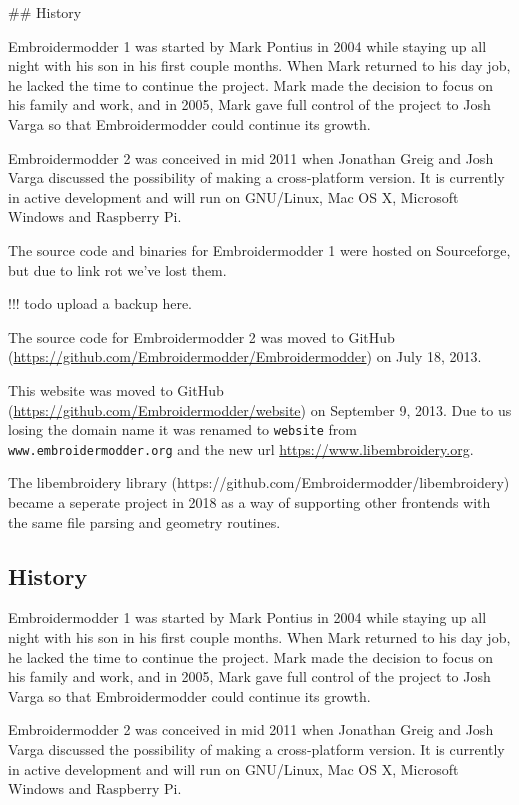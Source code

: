 ## History

Embroidermodder 1 was started by Mark Pontius in 2004 while staying up all night
with his son in his first couple months. When Mark returned to his day job,
he lacked the time to continue the project. Mark made the decision to focus on his
family and work, and in 2005, Mark gave full control of the project to Josh Varga
so that Embroidermodder could continue its growth.

Embroidermodder 2 was conceived in mid 2011 when Jonathan Greig and Josh Varga
discussed the possibility of making a cross-platform version. It is currently in
active development and will run on GNU/Linux, Mac OS X, Microsoft Windows and Raspberry Pi.

The source code and binaries for Embroidermodder 1 were hosted on Sourceforge, but
due to link rot we've lost them.

!!! todo
    upload a backup here.

The source code for Embroidermodder
2 was moved to GitHub (\url{https://github.com/Embroidermodder/Embroidermodder})
on July 18, 2013.

This website was moved to
GitHub (\url{https://github.com/Embroidermodder/website}) on September 9, 2013. Due to us losing the domain name it was renamed to
\texttt{website} from \texttt{www.embroidermodder.org} and the new url \url{https://www.libembroidery.org}.

The libembroidery library (https://github.com/Embroidermodder/libembroidery)
became a seperate project in 2018 as a way of supporting other frontends with the
same file parsing and geometry routines.

\subsection{History}

Embroidermodder 1 was started by Mark Pontius in 2004 while staying up all night
with his son in his first couple months. When Mark returned to his day job, he
lacked the time to continue the project. Mark made the decision to focus on his
family and work, and in 2005, Mark gave full control of the project to Josh Varga
so that Embroidermodder could continue its growth.

Embroidermodder 2 was conceived in mid 2011 when Jonathan Greig and Josh Varga
discussed the possibility of making a cross-platform version. It is currently in
active development and will run on GNU/Linux, Mac OS X, Microsoft Windows and
Raspberry Pi.

